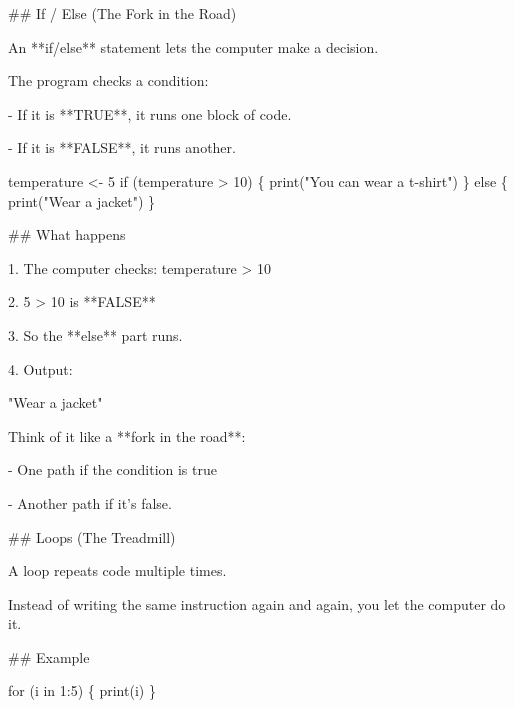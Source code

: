 \documentclass[
  letterpaper,
  DIV=11,
  numbers=noendperiod,
  oneside]{scrreprt}
\newenvironment{Shaded}{\begin{snugshade}}{\end{snugshade}}
\newcommand{\FunctionTok}[1]{\textcolor[rgb]{0.28,0.35,0.67}{#1}}
\newcommand{\InformationTok}[1]{\textcolor[rgb]{0.37,0.37,0.37}{#1}}
\newcommand{\NormalTok}[1]{\textcolor[rgb]{0.00,0.23,0.31}{#1}}
\newcommand{\SpecialStringTok}[1]{\textcolor[rgb]{0.13,0.47,0.30}{#1}}
\begin{document}
\begin{Shaded}
\begin{Highlighting}[numbers=left,,]
\FunctionTok{\#\# If / Else (The Fork in the Road)}

\NormalTok{An **if/else** statement lets the computer make a decision.}

\NormalTok{The program checks a condition:}

\SpecialStringTok{{-}   }\NormalTok{If it is **TRUE**, it runs one block of code.}

\SpecialStringTok{{-}   }\NormalTok{If it is **FALSE**, it runs another.}

\InformationTok{\textasciigrave{}\textasciigrave{}\textasciigrave{}         }
\InformationTok{temperature \textless{}{-} 5}
\InformationTok{if (temperature \textgreater{} 10) \{}
\InformationTok{  print("You can wear a t{-}shirt")}
\InformationTok{\} else \{}
\InformationTok{  print("Wear a jacket")}
\InformationTok{\}}
\InformationTok{\textasciigrave{}\textasciigrave{}\textasciigrave{}}

\FunctionTok{\#\# What happens}

\SpecialStringTok{1.  }\NormalTok{The computer checks: }\InformationTok{\textasciigrave{}temperature \textgreater{} 10\textasciigrave{}}

\SpecialStringTok{2.  }\InformationTok{\textasciigrave{}5 \textgreater{} 10\textasciigrave{}}\NormalTok{ is **FALSE**}

\SpecialStringTok{3.  }\NormalTok{So the **else** part runs.}

\SpecialStringTok{4.  }\NormalTok{Output:}

\InformationTok{\textasciigrave{}\textasciigrave{}\textasciigrave{}         }
\InformationTok{"Wear a jacket"}
\InformationTok{\textasciigrave{}\textasciigrave{}\textasciigrave{}}

\NormalTok{Think of it like a **fork in the road**:}

\SpecialStringTok{{-}   }\NormalTok{One path if the condition is true}

\SpecialStringTok{{-}   }\NormalTok{Another path if it’s false.}

\FunctionTok{\#\# Loops (The Treadmill)}

\NormalTok{A loop repeats code multiple times.}

\NormalTok{Instead of writing the same instruction again and again, you let the computer do it.}

\FunctionTok{\#\# Example}

\InformationTok{\textasciigrave{}\textasciigrave{}\textasciigrave{}         }
\InformationTok{for (i in 1:5) \{   }
\InformationTok{    print(i) }
\InformationTok{\}}
\InformationTok{\textasciigrave{}\textasciigrave{}\textasciigrave{}}


\end{Highlighting}
\end{Shaded}
\end{document}

